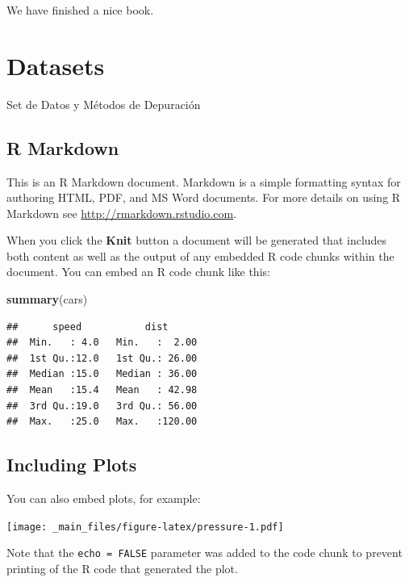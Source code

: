 \documentclass[]{article}
\newenvironment{Shaded}{\begin{snugshade}}{\end{snugshade}}
\newcommand{\KeywordTok}[1]{\textcolor[rgb]{0.13,0.29,0.53}{\textbf{#1}}}
\newcommand{\NormalTok}[1]{#1}
\begin{document}
We have finished a nice book.

\section{Datasets}\label{datasets}

Set de Datos y Métodos de Depuración

\subsection{R Markdown}\label{r-markdown}

This is an R Markdown document. Markdown is a simple formatting syntax
for authoring HTML, PDF, and MS Word documents. For more details on
using R Markdown see \url{http://rmarkdown.rstudio.com}.

When you click the \textbf{Knit} button a document will be generated
that includes both content as well as the output of any embedded R code
chunks within the document. You can embed an R code chunk like this:

\begin{Shaded}
\begin{Highlighting}[]
\KeywordTok{summary}\NormalTok{(cars)}
\end{Highlighting}
\end{Shaded}

\begin{verbatim}
##      speed           dist       
##  Min.   : 4.0   Min.   :  2.00  
##  1st Qu.:12.0   1st Qu.: 26.00  
##  Median :15.0   Median : 36.00  
##  Mean   :15.4   Mean   : 42.98  
##  3rd Qu.:19.0   3rd Qu.: 56.00  
##  Max.   :25.0   Max.   :120.00
\end{verbatim}

\subsection{Including Plots}\label{including-plots}

You can also embed plots, for example:

\texttt{[image: \_main\_files/figure-latex/pressure-1.pdf]}

Note that the \texttt{echo\ =\ FALSE} parameter was added to the code
chunk to prevent printing of the R code that generated the plot.

\printbibliography
\end{document}
